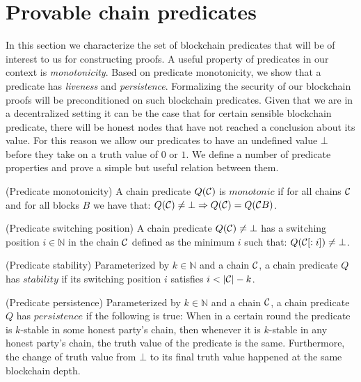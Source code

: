 \section{Provable chain predicates}

In this section we characterize the set of blockchain predicates that will be of interest
to us for constructing proofs.
A useful property of predicates in our context is \textit{monotonicity}. Based
on predicate monotonicity, we show that a predicate has \textit{liveness} and
\textit{persistence}. Formalizing the security of our  blockchain proofs  will be 
preconditioned on such blockchain predicates. Given that we are in a decentralized
setting it can be the case that for certain sensible blockchain predicate, there will
be honest nodes that have not reached a conclusion about its value. For this reason
we  allow our predicates to have an undefined value $\bot$ before they take
on a truth value of $0$ or $1$. We define a number of predicate properties
and prove a simple but useful relation between them. 

\begin{definition}{(Predicate monotonicity)}
    A chain predicate $Q(\mathcal{C})$ is $\textit{monotonic}$ if for all chains
    $\mathcal{C}$ and for all blocks $B$ we have that:
    $    Q(\mathcal{C}) \neq \bot \Rightarrow Q(\mathcal{C}) = Q(\mathcal{C} B) $. 

{(Predicate switching position)}
    A chain predicate $Q(\mathcal{C}) \neq \bot$ has a switching position $i \in
    \mathbb{N}$ in the chain $\mathcal{C}$ defined as the minimum $i$ such that:
 $       Q(\mathcal{C}[:i]) \neq \bot$. 
 
 {(Predicate stability)}
    Parameterized by $k \in \mathbb{N}$ and a chain $\mathcal{C}$, a chain predicate
    $Q$ has $\textit{stability}$ if its switching position $i$ satisfies $i <
    |\mathcal{C}| - k$.

{(Predicate persistence)}
    Parameterized by $k \in \mathbb{N}$ and a chain $\mathcal{C}$, a chain predicate
    $Q$ has $\textit{persistence}$ if the following is true: When in a certain
    round the predicate is $k$-stable in some honest party's chain, then
    whenever it is $k$-stable in any honest party's chain, the truth value of
    the predicate is the same. Furthermore, the change of truth value from
    $\bot$ to its final truth value happened at the same blockchain depth.

\end{definition}

